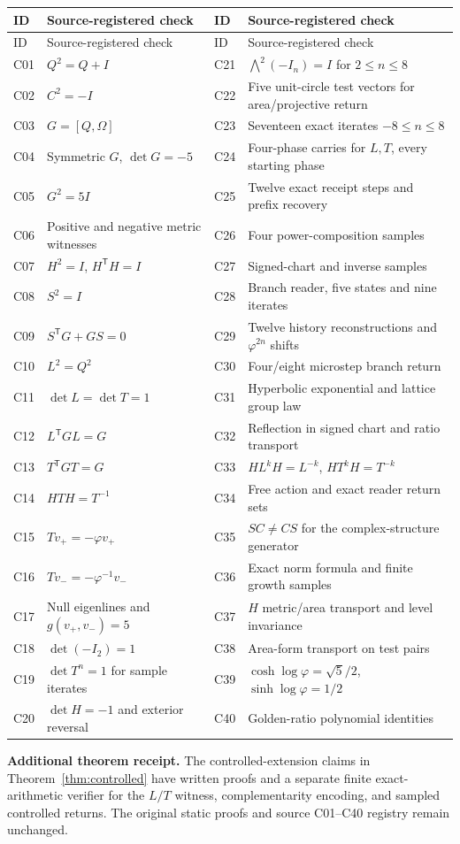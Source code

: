 \documentclass[10pt,letterpaper]{article}
\theoremstyle{definition}\newtheorem{definition}[theorem]{Definition}
\newcommand{\ph}{\varphi}
\begin{document}
\footnotesize
\begingroup\setlength{\tabcolsep}{3pt}
\begin{longtable}{@{}p{0.41in}p{2.77in}p{0.41in}p{2.77in}@{}}
\toprule ID & Source-registered check & ID & Source-registered check\\\midrule\endfirsthead
\toprule ID & Source-registered check & ID & Source-registered check\\\midrule\endhead
C01 & $Q^2=Q+I$ & C21 & $\bigwedge^2(-I_n)=I$ for $2\le n\le8$\\
C02 & $C^2=-I$ & C22 & Five unit-circle test vectors for area/projective return\\
C03 & $G=[Q,\Omega]$ & C23 & Seventeen exact iterates $-8\le n\le8$\\
C04 & Symmetric $G$, $\det G=-5$ & C24 & Four-phase carries for $L,T$, every starting phase\\
C05 & $G^2=5I$ & C25 & Twelve exact receipt steps and prefix recovery\\
C06 & Positive and negative metric witnesses & C26 & Four power-composition samples\\
C07 & $H^2=I$, $H^{\mathsf T}H=I$ & C27 & Signed-chart and inverse samples\\
C08 & $S^2=I$ & C28 & Branch reader, five states and nine iterates\\
C09 & $S^{\mathsf T}G+GS=0$ & C29 & Twelve history reconstructions and $\ph^{2n}$ shifts\\
C10 & $L^2=Q^2$ & C30 & Four/eight microstep branch return\\
C11 & $\det L=\det T=1$ & C31 & Hyperbolic exponential and lattice group law\\
C12 & $L^{\mathsf T}GL=G$ & C32 & Reflection in signed chart and ratio transport\\
C13 & $T^{\mathsf T}GT=G$ & C33 & $HL^kH=L^{-k}$, $HT^kH=T^{-k}$\\
C14 & $HTH=T^{-1}$ & C34 & Free action and exact reader return sets\\
C15 & $Tv_+=-\ph v_+$ & C35 & $SC\ne CS$ for the complex-structure generator\\
C16 & $Tv_-=-\ph^{-1}v_-$ & C36 & Exact norm formula and finite growth samples\\
C17 & Null eigenlines and $g(v_+,v_-)=5$ & C37 & $H$ metric/area transport and level invariance\\
C18 & $\det(-I_2)=1$ & C38 & Area-form transport on test pairs\\
C19 & $\det T^n=1$ for sample iterates & C39 & $\cosh\log\ph=\sqrt5/2$, $\sinh\log\ph=1/2$\\
C20 & $\det H=-1$ and exterior reversal & C40 & Golden-ratio polynomial identities\\
\bottomrule
\end{longtable}
\endgroup
\normalsize
\textbf{Additional theorem receipt.} The controlled-extension claims in Theorem~\ref{thm:controlled} have written proofs and a separate finite exact-arithmetic verifier for the $L/T$ witness, complementarity encoding, and sampled controlled returns. The original static proofs and source C01--C40 registry remain unchanged.
\end{document}
